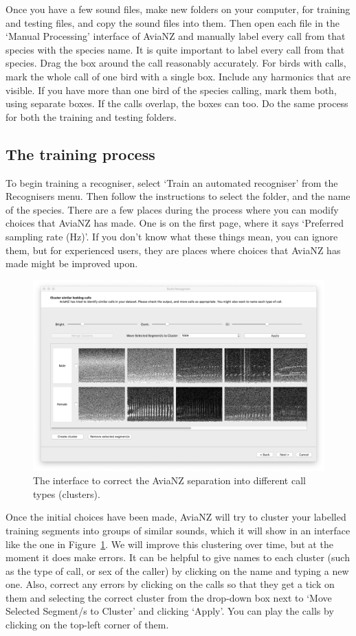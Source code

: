 \documentclass{article}
\begin{document}
Once you have a few sound files, make new folders on your computer, for training and testing files, and copy the sound files into them. Then open each file in the `Manual Processing' interface of AviaNZ and manually label every call from that species with the species name. It is quite important to label every call from that species. Drag the box around the call reasonably accurately. For birds with calls, mark the whole call of one bird with a single box. Include any harmonics that are visible. If you have more than one bird of the species calling, mark them both, using separate boxes. If the calls overlap, the boxes can too. Do the same process for both the training and testing folders.

\subsection{The training process}

To begin training a recogniser, select `Train an automated recogniser' from the Recognisers menu. Then follow the instructions to select the folder, and the name of the species. There are a few places during the process where you can modify choices that AviaNZ has made. One is on the first page, where it says `Preferred sampling rate (Hz)'. If you don't know what these things mean, you can ignore them, but for experienced users, they are places where choices that AviaNZ has made might be improved upon. 

    \begin{figure}[h]
    \centering
    \includegraphics[width=.6\textwidth]{Figs/Wizard_cluster}
    \caption{The interface to correct the AviaNZ separation into different call types (clusters).}
    \label{fig:clusters}
    \end{figure}
    
Once the initial choices have been made, AviaNZ will try to cluster your labelled training segments into groups of similar sounds, which it will show in an interface like the one in Figure~\ref{fig:clusters}. We will improve this clustering over time, but at the moment it does make errors. It can be helpful to give names to each cluster (such as the type of call, or sex of the caller) by clicking on the name and typing a new one. Also, correct any errors by clicking on the calls so that they get a tick on them and selecting the correct cluster from the drop-down box next to `Move Selected Segment/s to Cluster' and clicking `Apply'. You can play the calls by clicking on the top-left corner of them. 
\end{document}
